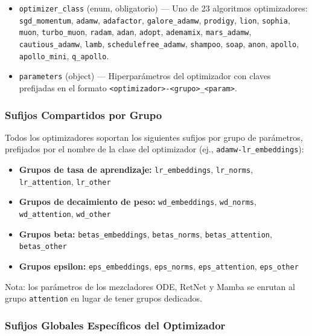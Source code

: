 \begin{itemize}[nosep]
    \item \texttt{optimizer\_class} (enum, obligatorio) --- Uno de 23 algoritmos optimizadores: \texttt{sgd\_momentum}, \texttt{adamw}, \texttt{adafactor}, \texttt{galore\_adamw}, \texttt{prodigy}, \texttt{lion}, \texttt{sophia}, \texttt{muon}, \texttt{turbo\_muon}, \texttt{radam}, \texttt{adan}, \texttt{adopt}, \texttt{ademamix}, \texttt{mars\_adamw}, \texttt{cautious\_adamw}, \texttt{lamb}, \texttt{schedulefree\_adamw}, \texttt{shampoo}, \texttt{soap}, \texttt{anon}, \texttt{apollo}, \texttt{apollo\_mini}, \texttt{q\_apollo}.
    \item \texttt{parameters} (object) --- Hiperparámetros del optimizador con claves prefijadas en el formato \texttt{<optimizador>-<grupo>\_<param>}.
\end{itemize}

\subsubsection{Sufijos Compartidos por Grupo}

Todos los optimizadores soportan los siguientes sufijos por grupo de parámetros, prefijados por el nombre de la clase del optimizador (ej., \texttt{adamw-lr\_embeddings}):

\begin{itemize}[nosep]
    \item \textbf{Grupos de tasa de aprendizaje:} \texttt{lr\_embeddings}, \texttt{lr\_norms}, \texttt{lr\_attention}, \texttt{lr\_other}
    \item \textbf{Grupos de decaimiento de peso:} \texttt{wd\_embeddings}, \texttt{wd\_norms}, \texttt{wd\_attention}, \texttt{wd\_other}
    \item \textbf{Grupos beta:} \texttt{betas\_embeddings}, \texttt{betas\_norms}, \texttt{betas\_attention}, \texttt{betas\_other}
    \item \textbf{Grupos epsilon:} \texttt{eps\_embeddings}, \texttt{eps\_norms}, \texttt{eps\_attention}, \texttt{eps\_other}
\end{itemize}

Nota: los parámetros de los mezcladores ODE, RetNet y Mamba se enrutan al grupo \texttt{attention} en lugar de tener grupos dedicados.

\subsubsection{Sufijos Globales Específicos del Optimizador}

